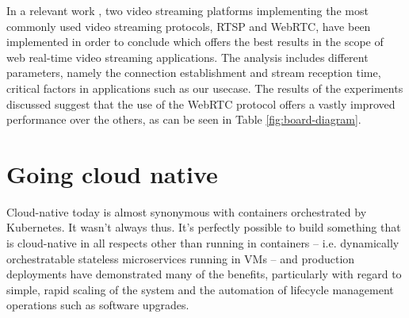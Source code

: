 In a relevant work \cite{impl-analysis-rtsp}, two video streaming platforms implementing the most commonly used video streaming protocols, RTSP and WebRTC, have been implemented in order to conclude which offers the best results in the scope of web real-time video streaming applications. The analysis includes different parameters, namely the connection establishment and stream reception time, critical factors in applications such as our usecase. The results of the experiments discussed suggest that the use of the WebRTC protocol offers a vastly improved performance over the others, as can be seen in Table \ref{fig:board-diagram}.


\newpage
\section{Going cloud native}

Cloud-native today is almost synonymous with containers orchestrated by Kubernetes.  It wasn’t always thus.  It’s perfectly possible to build something that is cloud-native in all respects other than running in containers – i.e. dynamically orchestratable stateless microservices running in VMs – and production deployments have demonstrated many of the benefits, particularly with regard to simple, rapid scaling of the system and the automation of lifecycle management operations such as software upgrades.  

